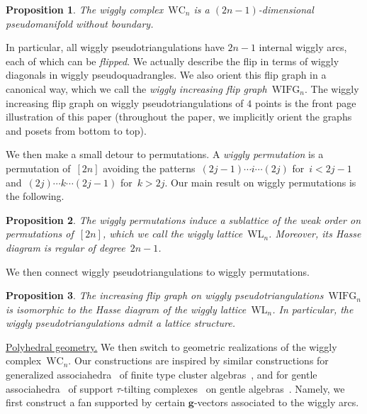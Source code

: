 \documentclass{amsart}
\newtheorem*{proposition*}{Proposition}%
\theoremstyle{definition}
\renewcommand{\b}[1]{{\boldsymbol{#1}}} %
\newcommand{\darkblue}{\color{darkblue}} %
\newcommand{\defn}[1]{\textsl{\darkblue #1}} %
\newcommand{\para}[1]{\smallskip\noindent\uline{#1.}} %
\newcommand{\wigglyComplex}{\mathrm{WC}} %
\newcommand{\wigglyIncreasingFlipGraph}{\mathrm{WIFG}} %
\newcommand{\wigglyLattice}{\mathrm{WL}} %
\begin{document}
\begin{proposition*}
The wiggly complex~$\wigglyComplex_n$ is a $(2n-1)$-dimensional pseudomanifold without boundary.
\end{proposition*}

In particular, all wiggly pseudotriangulations have $2n-1$ internal wiggly arcs, each of which can be \defn{flipped}.
We actually describe the flip in terms of wiggly diagonals in wiggly pseudoquadrangles.
We also orient this flip graph in a canonical way, which we call the \defn{wiggly increasing flip graph}~$\wigglyIncreasingFlipGraph_n$.
The wiggly increasing flip graph on wiggly pseudotriangulations of $4$ points is the front page illustration of this paper (throughout the paper, we implicitly orient the graphs and posets from bottom to top).

We then make a small detour to permutations.
A \defn{wiggly permutation} is a permutation of~$[2n]$ avoiding the patterns~$(2j-1) \cdots i \cdots (2j)$ for~$i < 2j-1$ and~$(2j) \cdots k \cdots (2j-1)$ for~$k > 2j$.
Our main result on wiggly permutations is the following.

\begin{proposition*}
The wiggly permutations induce a sublattice of the weak order on permutations of~$[2n]$, which we call the \defn{wiggly lattice}~$\wigglyLattice_n$. Moreover, its Hasse diagram is regular of degree~$2n-1$.
\end{proposition*}

We then connect wiggly pseudotriangulations to wiggly permutations.

\begin{proposition*}
The increasing flip graph on wiggly pseudotriangulations~$\wigglyIncreasingFlipGraph_n$ is isomorphic to the Hasse diagram of the wiggly lattice~$\wigglyLattice_n$. In particular, the wiggly pseudotriangulations admit a lattice structure.
\end{proposition*}

\para{Polyhedral geometry}
We then switch to geometric realizations of the wiggly complex~$\wigglyComplex_n$.
Our constructions are inspired by similar constructions for generalized associahedra~\cite{HohlwegLangeThomas,HohlwegPilaudStella} of finite type cluster algebras~\cite{FominZelevinsky-ClusterAlgebrasI,FominZelevinsky-ClusterAlgebrasII}, and for gentle associahedra~\cite{PaluPilaudPlamondon-nonkissing} of support \mbox{$\tau$-tilting} complexes~\cite{AdachiIyamaReiten} on gentle algebras~\cite{ButlerRingel}.
Namely, we first construct a fan supported by certain $\b{g}$-vectors associated to the wiggly arcs.
\end{document}
